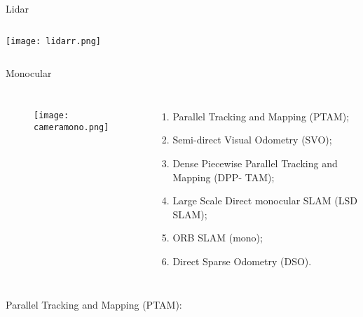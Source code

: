 \begin{frame}[t]{Lidar}
    \transboxout[duration=0.5]
    \begin{columns}
            \texttt{[image: lidarr.png]}
    \end{columns}
\end{frame}
\begin{frame}[t]{Monocular}
    \transboxout[duration=0.5]
    \begin{columns}
            \begin{figure}
                \texttt{[image: cameramono.png]}
                \caption{\cite{Baslerca30}}
            \end{figure}
            \begin{enumerate}
                \item Parallel Tracking and Mapping (PTAM);
                \item Semi-direct Visual Odometry (SVO);
                \item Dense Piecewise Parallel Tracking and Mapping (DPP-
                        TAM);
                \item Large Scale Direct monocular SLAM (LSD SLAM);
                \item ORB SLAM (mono);
                \item Direct Sparse Odometry (DSO).
            \end{enumerate}
    \end{columns}
\end{frame}
\begin{frame}[c]{Parallel Tracking and Mapping (PTAM):}
    \centering


\end{frame}
